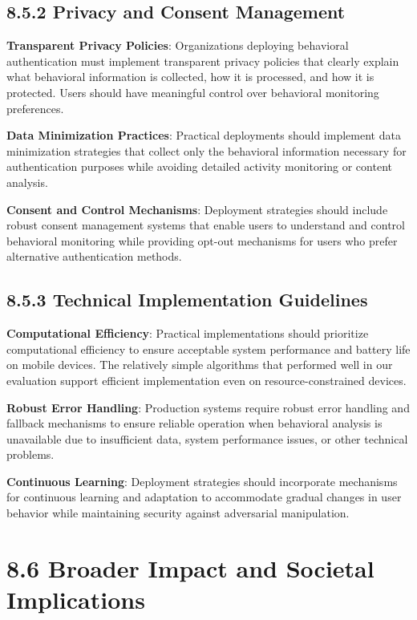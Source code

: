 \documentclass[
  12pt,
  a4paper,
]{report}
\begin{document}
\subsection{8.5.2 Privacy and Consent
Management}\label{privacy-and-consent-management}

\textbf{Transparent Privacy Policies}: Organizations deploying
behavioral authentication must implement transparent privacy policies
that clearly explain what behavioral information is collected, how it is
processed, and how it is protected. Users should have meaningful control
over behavioral monitoring preferences.

\textbf{Data Minimization Practices}: Practical deployments should
implement data minimization strategies that collect only the behavioral
information necessary for authentication purposes while avoiding
detailed activity monitoring or content analysis.

\textbf{Consent and Control Mechanisms}: Deployment strategies should
include robust consent management systems that enable users to
understand and control behavioral monitoring while providing opt-out
mechanisms for users who prefer alternative authentication methods.

\subsection{8.5.3 Technical Implementation
Guidelines}\label{technical-implementation-guidelines}

\textbf{Computational Efficiency}: Practical implementations should
prioritize computational efficiency to ensure acceptable system
performance and battery life on mobile devices. The relatively simple
algorithms that performed well in our evaluation support efficient
implementation even on resource-constrained devices.

\textbf{Robust Error Handling}: Production systems require robust error
handling and fallback mechanisms to ensure reliable operation when
behavioral analysis is unavailable due to insufficient data, system
performance issues, or other technical problems.

\textbf{Continuous Learning}: Deployment strategies should incorporate
mechanisms for continuous learning and adaptation to accommodate gradual
changes in user behavior while maintaining security against adversarial
manipulation.

\section{8.6 Broader Impact and Societal
Implications}\label{broader-impact-and-societal-implications}
\end{document}
